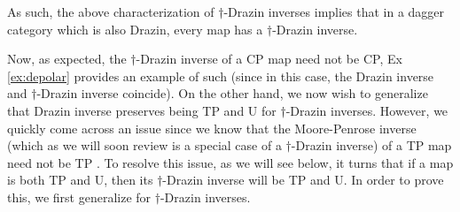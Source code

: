 \documentclass[submission,copyright,creativecommons]{eptcs}
\begin{document}
As such, the above characterization of $\dagger$-Drazin inverses implies that in a dagger category which is also Drazin, every map has a $\dagger$-Drazin inverse. 

Now, as expected, the $\dagger$-Drazin inverse of a CP map need not be CP, Ex \ref{ex:depolar} provides an example of such (since in this case, the Drazin inverse and $\dagger$-Drazin inverse coincide). On the other hand, we now wish to generalize that Drazin inverse preserves being TP and U for $\dagger$-Drazin inverses. However, we quickly come across an issue since we know that the Moore-Penrose inverse (which as we will soon review is a special case of a $\dagger$-Drazin inverse) of a TP map need not be TP \cite[Ex 2]{cao2021nisq}. To resolve this issue, as we will see below, it turns that if a map is both TP and U, then its $\dagger$-Drazin inverse will be TP and U. In order to prove this, we first generalize \cite[Prop 3.10]{cockett2024drazin} for $\dagger$-Drazin inverses. 
\end{document}
